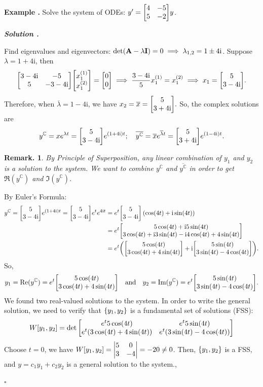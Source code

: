\documentclass[12pt, a4paper]{article}
\newcounter{index}[subsection]
\newenvironment*{eg}{\begin{framed}\par\noindent\textbf{Example \thesubsection.\stepcounter{index}\theindex}}{\par\end{framed}}
\newcounter{nprf}[subsection]
\newenvironment*{sol}{\par\indent\textbf{\textit{Solution \stepcounter{nprf}\thenprf.}}\par}{\hfill{$\square$}\par}
\newtheorem*{rmk}{Remark.}
\def\C{{\mathbb{C}}}
\def\i{{\mathrm{i}}}
\def\A{\vb A}
\begin{document}
\begin{eg}{}
	Solve the system of ODEs: $y'=\mqty[4&-5\\5&-2]y$.
	\begin{sol}
		Find eigenvalues and eigenvectors: $\det(\A-\lambda\vb I)=0\implies\lambda_{1,2}=1\pm4\i$.	Suppose $\lambda=1+4\i$, then \[\mqty[3-4\i&-5\\5&-3-4\i]\mqty[x_1^{(1)}\\x_1^{(2)}]=\mqty[0\\0]\implies\dfrac{3-4\i}{5}x_1^{(1)}=x_1^{(2)}\implies x_1=\mqty[5\\3-4\i].\] Therefore, when $\overline{\lambda}=1-4\i$, we have $x_2=\overline{x}=\mqty[5\\3+4\i].$ So, the complex solutions are \[y^\C=xe^{\lambda t}=\mqty[5\\3-4\i]e^{(1+4\i)t};\quad \overline{y^\C}=\overline{x}e^{\overline{\lambda}t}=\mqty[5\\3+4\i]e^{(1-4\i)t}.\]\begin{rmk}By Principle of Superposition, any linear combination of $y_1$ and $y_2$ is a solution to the system. We want to combine $y^\C$ and $\overline{y^\C}$ in order to get $\Re(y^\C)$ and $\Im(y^\C)$.\end{rmk} By Euler's Formula: \begin{align*}y^\C=\mqty[5\\3-4\i]e^{(1+4\i)t}=\mqty[5\\3-4\i]e^te^{4\i t}&=e^t\mqty[5\\3-4\i](\cos(4t)+\i\sin(4t))\\&=e^t\mqty[5\cos(4t)+\i5\sin(4t)\\3\cos(4t)+\i3\sin(4t)-\i4\cos(4t)+4\sin(4t)]\\&=e^t\qty(\mqty[5\cos(4t)\\3\cos(4t)+4\sin(4t)]+\i\mqty[5\sin(4t)\\3\sin(4t)-4\cos(4t)]).\end{align*} So, \[y_1=\Re(y^\C)=e^t\mqty[5\cos(4t)\\3\cos(4t)+4\sin(4t)]\quad\text{and}\quad y_2=\Im(y^\C)=e^t\mqty[5\sin(4t)\\3\sin(4t)-4\cos(4t)].\] We found two real-valued solutions to the system. In order to write the general solution, we need to verify that $\qty{y_1,y_2}$ is a fundamental set of solutions (FSS): \[W\qty[y_1,y_2]=\det\mqty[e^t5\cos(4t)&e^t5\sin(4t)\\e^t(3\cos(4t)+4\sin(4t))&e^t(3\sin(4t)-4\cos(4t))]\] Choose $t=0$, we have $W\qty[y_1,y_2]=\mqty|5&0\\3&-4|=-20\neq0$. Then, $\qty{y_1,y_2}$ is a FSS, and $y=c_1y_1+c_2y_2$ is a general solution to the system., 

	\end{sol}
\end{eg}
\end{document}
